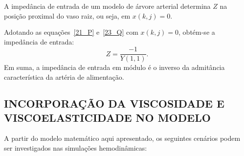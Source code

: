 \documentclass[a4paper,12pt]{monografia}
\theoremstyle{plain}
\theoremstyle{definition}
\theoremstyle{remark}
\begin{document}
A impedância de entrada de um modelo de árvore arterial determina $Z$ na posição proximal do vaso raiz, ou seja, em $x (k,j) = 0$. 

Adotando as equações~\eqref{21_P} e~\eqref{23_Q} com $x (k,j) = 0$, obtém-se a impedância de entrada:
\begin{equation}
	Z = \frac{-1}{Y(1,1)}.
\end{equation}
Em suma, a impedância de entrada  em módulo é o inverso da admitância característica da artéria de alimentação.

\subsection{INCORPORAÇÃO DA VISCOSIDADE E VISCOELASTICIDADE NO MODELO}
\label{sec:cenario}
A partir do modelo matemático aqui apresentado, os seguintes cenários podem ser investigados nas simulações hemodinâmicas:
\end{document}

